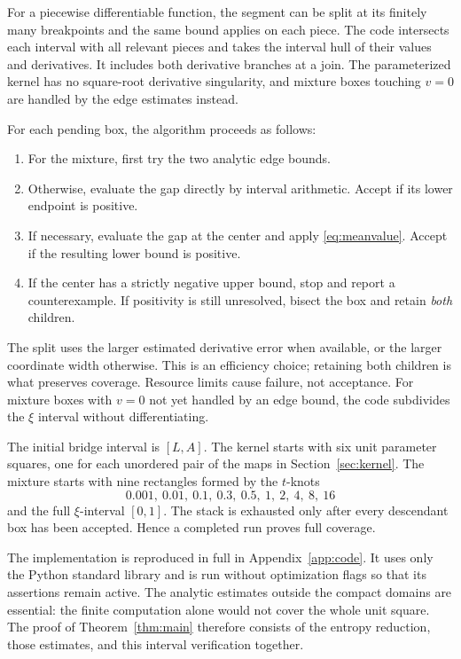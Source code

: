 \documentclass[11pt]{article}
\theoremstyle{remark}
\begin{document}
For a piecewise differentiable function, the segment can be
split at its finitely many breakpoints and the same bound applies
on each piece. The code intersects each interval with all relevant
pieces and takes the interval hull of their values and derivatives.
It includes both derivative branches at a join. The parameterized
kernel has no square-root derivative singularity, and mixture
boxes touching \(v=0\) are handled by the edge estimates instead.

For each pending box, the algorithm proceeds as follows:
\begin{enumerate}
\item For the mixture, first try the two analytic edge bounds.
\item Otherwise, evaluate the gap directly by interval arithmetic.
Accept if its lower endpoint is positive.
\item If necessary, evaluate the gap at the center and apply
\eqref{eq:meanvalue}. Accept if the resulting lower bound is positive.
\item If the center has a strictly negative upper bound, stop and
report a counterexample. If positivity is still unresolved, bisect
the box and retain \emph{both} children.
\end{enumerate}
The split uses the larger estimated derivative error when available,
or the larger coordinate width otherwise. This is an efficiency
choice; retaining both children is what preserves coverage.
Resource limits cause failure, not acceptance.
For mixture boxes with \(v=0\) not yet handled by an edge bound,
the code subdivides the \(\xi\) interval without differentiating.

The initial bridge interval is \([L,A]\).
The kernel starts with six unit parameter squares, one for each
unordered pair of the maps in Section~\ref{sec:kernel}.
The mixture starts with nine rectangles formed by the \(t\)-knots
\[
0.001,\ 0.01,\ 0.1,\ 0.3,\ 0.5,\ 1,\ 2,\ 4,\ 8,\ 16
\]
and the full \(\xi\)-interval \([0,1]\).
The stack is exhausted only after every descendant box has been
accepted. Hence a completed run proves full coverage.


The implementation is reproduced in full in Appendix~\ref{app:code}.
It uses only the Python standard library and is run without
optimization flags so that its assertions remain active. The analytic estimates outside the compact domains
are essential: the finite computation alone would not cover the
whole unit square. The proof of Theorem~\ref{thm:main} therefore consists
of the entropy reduction, those estimates, and this interval
verification together.
\end{document}
